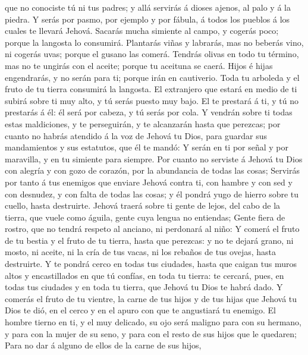 que no conociste tú ni tus padres; y allá servirás á dioses ajenos, al
palo y á la piedra.  Y serás por pasmo, por ejemplo y por
fábula, á todos los pueblos á los cuales te llevará Jehová.
 Sacarás mucha simiente al campo, y cogerás poco; porque la
langosta lo consumirá.  Plantarás viñas y labrarás, mas no
beberás vino, ni cogerás uvas; porque el gusano las comerá.
 Tendrás olivas en todo tu término, mas no te ungirás con
el aceite; porque tu aceituna se caerá.  Hijos é hijas
engendrarás, y no serán para ti; porque irán en cautiverio.
 Toda tu arboleda y el fruto de tu tierra consumirá la
langosta.  El extranjero que estará en medio de ti subirá
sobre ti muy alto, y tú serás puesto muy bajo.  El te
prestará á ti, y tú no prestarás á él: él será por cabeza, y tú serás
por cola.  Y vendrán sobre ti todas estas maldiciones, y te
perseguirán, y te alcanzarán hasta que perezcas; por cuanto no habrás
atendido á la voz de Jehová tu Dios, para guardar sus mandamientos y sus
estatutos, que él te mandó:  Y serán en ti por señal y por
maravilla, y en tu simiente para siempre.  Por cuanto no
serviste á Jehová tu Dios con alegría y con gozo de corazón, por la
abundancia de todas las cosas;  Servirás por tanto á tus
enemigos que enviare Jehová contra ti, con hambre y con sed y con
desnudez, y con falta de todas las cosas; y él pondrá yugo de hierro
sobre tu cuello, hasta destruirte.  Jehová traerá sobre ti
gente de lejos, del cabo de la tierra, que vuele como águila, gente cuya
lengua no entiendas;  Gente fiera de rostro, que no tendrá
respeto al anciano, ni perdonará al niño:  Y comerá el
fruto de tu bestia y el fruto de tu tierra, hasta que perezcas: y no te
dejará grano, ni mosto, ni aceite, ni la cría de tus vacas, ni los
rebaños de tus ovejas, hasta destruirte.  Y te pondrá cerco
en todas tus ciudades, hasta que caigan tus muros altos y encastillados
en que tú confías, en toda tu tierra: te cercará, pues, en todas tus
ciudades y en toda tu tierra, que Jehová tu Dios te habrá dado.
 Y comerás el fruto de tu vientre, la carne de tus hijos y
de tus hijas que Jehová tu Dios te dió, en el cerco y en el apuro con
que te angustiará tu enemigo.  El hombre tierno en ti, y el
muy delicado, su ojo será maligno para con su hermano, y para con la
mujer de su seno, y para con el resto de sus hijos que le quedaren;
 Para no dar á alguno de ellos de la carne de sus hijos,

